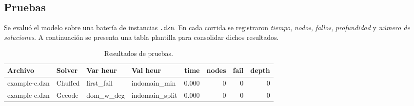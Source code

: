 
\subsection{Pruebas}\label{sec:05-reunion-pruebas}
Se evaluó el modelo sobre una batería de instancias \texttt{.dzn}. En cada corrida se registraron \emph{tiempo}, \emph{nodos}, \emph{fallos}, \emph{profundidad} y \emph{número de soluciones}. A continuación se presenta una tabla plantilla para consolidar dichos resultados.

\begin{table}[!htbp]
  \centering
  \small
  \setlength{\tabcolsep}{2.8pt}
  \caption{Resultados de pruebas.}
  \label{tab:pruebas-reunion}
  \begin{tabular}{l l l l r r r r}
    \toprule
    \textbf{Archivo} & \textbf{Solver} & \textbf{Var heur} & \textbf{Val heur} & \textbf{time} & \textbf{nodes} & \textbf{fail} & \textbf{depth} \\
    \midrule
    example-e.dzn & Chuffed & first\_fail  & indomain\_min   & 0.000 & 0 & 0 & 0 \\
    example-e.dzn & Gecode  & dom\_w\_deg  & indomain\_split & 0.000 & 0 & 0 & 0 \\
    \bottomrule
  \end{tabular}
\end{table}

